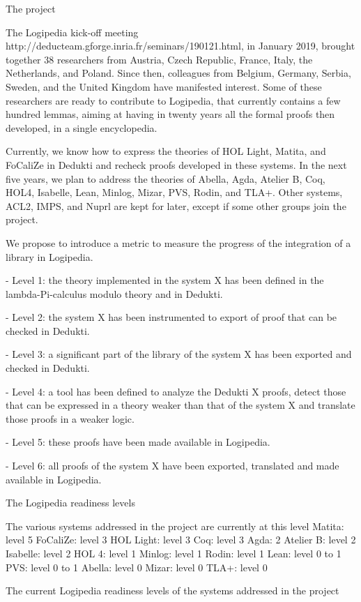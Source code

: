 The project

The Logipedia kick-off meeting
http://deducteam.gforge.inria.fr/seminars/190121.html, in January
2019, brought together 38 researchers from Austria, Czech Republic,
France, Italy, the Netherlands, and Poland. Since then, colleagues
from Belgium, Germany, Serbia, Sweden, and the United Kingdom have
manifested interest. Some of these researchers are ready to contribute
to Logipedia, that currently contains a few hundred lemmas, aiming at
having in twenty years all the formal proofs then developed, in a
single encyclopedia.

Currently, we know how to express the theories of HOL Light, Matita,
and FoCaliZe in Dedukti and recheck proofs developed in these
systems. In the next five years, we plan to address the theories of
Abella, Agda, Atelier B, Coq, HOL4, Isabelle, Lean, Minlog,
Mizar, PVS, Rodin, and TLA+. Other systems, ACL2, IMPS, and Nuprl are
kept for later, except if some other groups join the project.


We propose to introduce a metric to measure the progress of the
integration of a library in Logipedia.


- Level 1: the theory implemented in the system X has been defined in
the lambda-Pi-calculus modulo theory and in Dedukti.

- Level 2: the system X has been instrumented to export of proof that
can be checked in Dedukti.

- Level 3: a significant part of the library of the system X has been exported and checked in Dedukti.

- Level 4: a tool has been defined to analyze the Dedukti X proofs,
detect those that can be expressed in a theory weaker than that of the
system X and translate those proofs in a weaker logic.

- Level 5: these proofs have been made available in Logipedia.

- Level 6: all proofs of the system X have been exported, translated
and made available in Logipedia.

The Logipedia readiness levels

The various systems addressed in the project are currently at this level 
Matita: level 5
FoCaliZe: level 3
HOL Light: level 3
Coq: level 3
Agda: 2
Atelier B: level 2
Isabelle: level 2
HOL 4: level 1
Minlog: level 1
Rodin: level 1
Lean: level 0 to 1
PVS: level 0 to 1
Abella: level 0
Mizar: level 0
TLA+: level 0

The current Logipedia readiness levels of the systems addressed in the project

